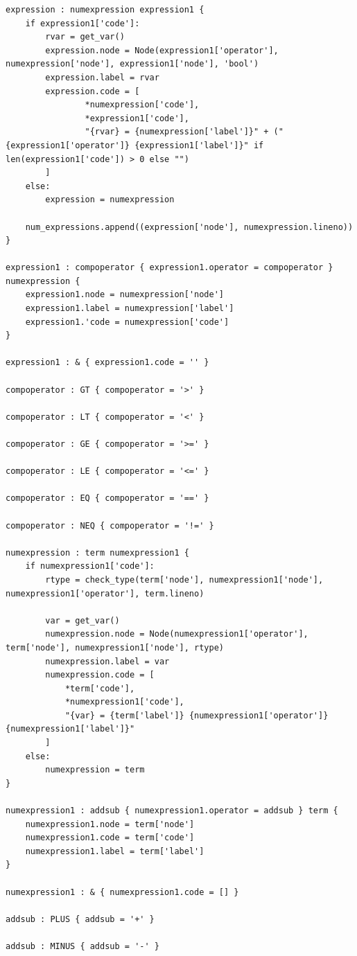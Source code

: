 \documentclass[
	12pt,				%
	openright,			%
	twoside,			%
	a4paper,			%
	english,			%
	french,				%
	spanish,			%
	brazil				%
	]{abntex2}
\begin{document}
\begin{apendicesenv}
\begin{lstlisting}
expression : numexpression expression1 {
    if expression1['code']:
        rvar = get_var()
        expression.node = Node(expression1['operator'], numexpression['node'], expression1['node'], 'bool')
        expression.label = rvar
        expression.code = [
                *numexpression['code'],
                *expression1['code'],
                "{rvar} = {numexpression['label']}" + (" {expression1['operator']} {expression1['label']}" if len(expression1['code']) > 0 else "")
        ]
    else:
        expression = numexpression

    num_expressions.append((expression['node'], numexpression.lineno))
}

expression1 : compoperator { expression1.operator = compoperator } numexpression {
    expression1.node = numexpression['node']
    expression1.label = numexpression['label']
    expression1.'code = numexpression['code']
}

expression1 : & { expression1.code = '' }

compoperator : GT { compoperator = '>' }

compoperator : LT { compoperator = '<' }

compoperator : GE { compoperator = '>=' }

compoperator : LE { compoperator = '<=' }

compoperator : EQ { compoperator = '==' }

compoperator : NEQ { compoperator = '!=' }

numexpression : term numexpression1 {
    if numexpression1['code']:
        rtype = check_type(term['node'], numexpression1['node'], numexpression1['operator'], term.lineno)

        var = get_var()
        numexpression.node = Node(numexpression1['operator'], term['node'], numexpression1['node'], rtype)
        numexpression.label = var
        numexpression.code = [
            *term['code'], 
            *numexpression1['code'], 
            "{var} = {term['label']} {numexpression1['operator']} {numexpression1['label']}"
        ]
    else:
        numexpression = term
}

numexpression1 : addsub { numexpression1.operator = addsub } term {
    numexpression1.node = term['node']
    numexpression1.code = term['code']
    numexpression1.label = term['label']
}

numexpression1 : & { numexpression1.code = [] }

addsub : PLUS { addsub = '+' }

addsub : MINUS { addsub = '-' }


\end{lstlisting}
\end{apendicesenv}
\end{document}
